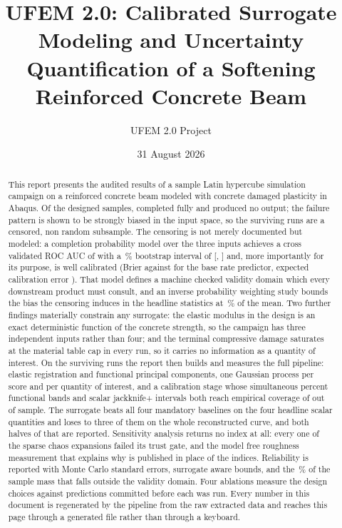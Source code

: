 \documentclass[11pt,a4paper]{article}
\title{UFEM 2.0: Calibrated Surrogate Modeling and Uncertainty\\Quantification of a Softening Reinforced Concrete Beam}
\author{UFEM 2.0 Project}
\date{31 August 2026}
\begin{document}
\maketitle

\begin{abstract}
This report presents the audited results of a \NDesign{} sample Latin hypercube simulation campaign on a reinforced concrete beam modeled with concrete damaged plasticity in Abaqus. Of the \NDesign{} designed samples, \NValid{} completed fully and \NMissing{} produced no output; the failure pattern is shown to be strongly biased in the input space, so the surviving runs are a censored, non random subsample. The censoring is not merely documented but modeled: a completion probability model over the three inputs achieves a cross validated ROC AUC of \CompletionAUC{} with a \CompletionIntervalLevel\,\% bootstrap interval of [\CompletionAUCLow{}, \CompletionAUCHigh{}] and, more importantly for its purpose, is well calibrated (Brier \CompletionBrier{} against \CompletionBrierBaseline{} for the base rate predictor, expected calibration error \CompletionECE{}). That model defines a machine checked validity domain which every downstream product must consult, and an inverse probability weighting study bounds the bias the censoring induces in the headline statistics at \WeightLargestShift\,\% of the mean. Two further findings materially constrain any surrogate: the elastic modulus in the design is an exact deterministic function of the concrete strength, so the campaign has three independent inputs rather than four; and the terminal compressive damage saturates at the material table cap in every run, so it carries no information as a quantity of interest. On the surviving runs the report then builds and measures the full pipeline: elastic registration and functional principal components, one Gaussian process per score and per quantity of interest, and a calibration stage whose simultaneous \MCBandLevel{} percent functional bands and scalar jackknife+ intervals both reach empirical coverage of \BandForceCoverage{} out of sample. The surrogate beats all four mandatory baselines on the four headline scalar quantities and loses to three of them on the whole reconstructed curve, and both halves of that are reported. Sensitivity analysis returns no index at all: every one of the \SensTargets{} sparse chaos expansions failed its trust gate, and the model free roughness measurement that explains why is published in place of the indices. Reliability is reported with Monte Carlo standard errors, surrogate aware bounds, and the \OutOfDomainPct\,\% of the sample mass that falls outside the validity domain. Four ablations measure the design choices against predictions committed before each was run. Every number in this document is regenerated by the pipeline from the raw extracted data and reaches this page through a generated file rather than through a keyboard.
\end{abstract}
\end{document}

